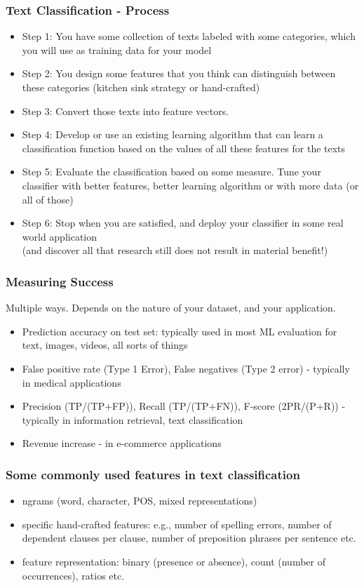 \documentclass{beamer}
\begin{document}
\begin{frame}
\frametitle{Text Classification - Process}
\begin{itemize}
\item Step 1: You have some collection of texts labeled with some categories, which you will use as training data for your model \pause
\item Step 2: You design some features that you think can distinguish between these categories (kitchen sink strategy or hand-crafted) \pause
\item Step 3: Convert those texts into feature vectors. \pause
\item Step 4: Develop or use an existing learning algorithm that can learn a classification function based on the values of all these features for the texts \pause
\item Step 5: Evaluate the classification based on some measure. Tune your classifier with better features, better learning algorithm or with more data (or all of those) \pause
\item Step 6: Stop when you are satisfied, and deploy your classifier in some real world application \pause \\ (and discover all that research still does not result in material benefit!)
\end{itemize}
\end{frame}

\begin{frame}
\frametitle{Measuring Success}
Multiple ways. Depends on the nature of your dataset, and your application.
\begin{itemize}
\item Prediction accuracy on test set: typically used in most ML evaluation for text, images, videos, all sorts of things
\item False positive rate (Type 1 Error), False negatives (Type 2 error) - typically in medical applications
\item Precision (TP/(TP+FP)), Recall (TP/(TP+FN)), F-score (2PR/(P+R)) - typically in information retrieval, text classification
\item Revenue increase - in e-commerce applications
\end{itemize}
\end{frame}

\begin{frame}
\frametitle{Some commonly used features in text classification}
\begin{itemize}
\item ngrams (word, character, POS, mixed representations)
\item specific hand-crafted features: e.g., number of spelling errors, number of dependent clauses per clause, number of preposition phrases per sentence etc.
\item feature representation: binary (presence or absence), count (number of occurrences), ratios etc.
\end{itemize}
\end{frame}
\end{document}

